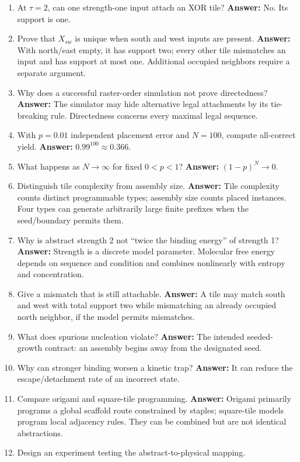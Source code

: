 \begin{enumerate}
\item At $\tau=2$, can one strength-one input attach an XOR tile?
\textbf{Answer:} No. Its support is one.
\item Prove that $X_{sw}$ is unique when south and west inputs are present.
\textbf{Answer:} With north/east empty, it has support two; every other tile
mismatches an input and has support at most one. Additional occupied neighbors
require a separate argument.
\item Why does a successful raster-order simulation not prove directedness?
\textbf{Answer:} The simulator may hide alternative legal attachments by its
tie-breaking rule. Directedness concerns every maximal legal sequence.
\item With $p=0.01$ independent placement error and $N=100$, compute all-correct
yield. \textbf{Answer:} $0.99^{100}\approx0.366$.
\item What happens as $N\to\infty$ for fixed $0<p<1$?
\textbf{Answer:} $(1-p)^N\to0$.
\item Distinguish tile complexity from assembly size.
\textbf{Answer:} Tile complexity counts distinct programmable types; assembly
size counts placed instances. Four types can generate arbitrarily large finite
prefixes when the seed/boundary permits them.
\item Why is abstract strength 2 not ``twice the binding energy'' of strength 1?
\textbf{Answer:} Strength is a discrete model parameter. Molecular free energy
depends on sequence and condition and combines nonlinearly with entropy and
concentration.
\item Give a mismatch that is still attachable.
\textbf{Answer:} A tile may match south and west with total support two while
mismatching an already occupied north neighbor, if the model permits mismatches.
\item What does spurious nucleation violate?
\textbf{Answer:} The intended seeded-growth contract: an assembly begins away
from the designated seed.
\item Why can stronger binding worsen a kinetic trap?
\textbf{Answer:} It can reduce the escape/detachment rate of an incorrect state.
\item Compare origami and square-tile programming.
\textbf{Answer:} Origami primarily programs a global scaffold route constrained
by staples; square-tile models program local adjacency rules. They can be
combined but are not identical abstractions.
\item Design an experiment testing the abstract-to-physical mapping.

\end{enumerate}
